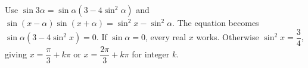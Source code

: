 Use $\sin3\alpha=\sin\alpha(3-4\sin^2\alpha)$ and $\sin(x-\alpha)\sin(x+\alpha)=\sin^2x-\sin^2\alpha$. The equation becomes $\sin\alpha(3-4\sin^2x)=0$. If $\sin\alpha=0$, every real $x$ works. Otherwise $\sin^2 x = \dfrac{3}{4}$, giving $\boxed{x = \dfrac{\pi}{3} + k \pi \text{ or } x = \dfrac{2 \pi}{3} + k \pi}$ for integer $k$.
